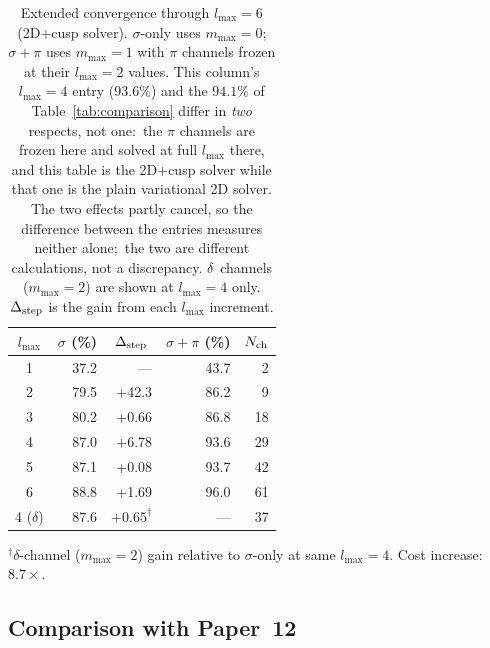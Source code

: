 \documentclass[aps,pra,twocolumn,superscriptaddress,longbibliography]{revtex4-2}
\begin{document}
\begin{table}[h]
\caption{Extended convergence through $l_{\max} = 6$ (2D+cusp solver).
  $\sigma$-only uses $m_{\max} = 0$;
  $\sigma{+}\pi$ uses $m_{\max} = 1$ with $\pi$ channels frozen at
  their $l_{\max} = 2$ values.  This column's $l_{\max} = 4$ entry
  ($93.6\%$) and the $94.1\%$ of Table~\ref{tab:comparison} differ in
  \emph{two} respects, not one:\ the $\pi$ channels are frozen here and
  solved at full $l_{\max}$ there, and this table is the 2D+cusp solver
  while that one is the plain variational 2D solver.  The two effects
  partly cancel, so the difference between the entries measures
  neither alone;\ the two are different calculations, not a
  discrepancy.
  $\delta$~channels ($m_{\max} = 2$) are shown at $l_{\max} = 4$ only.
  $\Delta_{\rm step}$ is the gain from each $l_{\max}$ increment.}
\label{tab:extended_convergence}
\begin{ruledtabular}
\begin{tabular}{cdddd}
$l_{\max}$
  & 
  & 
  & 
  &  \\
 &  37.2 & ---   & 43.7 &   2 \\
2 &  79.5 & +42.3 & 86.2 &   9 \\
3 &  80.2 & +0.66 & 86.8 &  18 \\
4 &  87.0 & +6.78 & 93.6 &  29 \\
5 &  87.1 & +0.08 & 93.7 &  42 \\
6 &  88.8 & +1.69 & 96.0 &  61 \\
 ($\delta$) & 87.6 &  & --- & 37 \\
\end{tabular}
\end{ruledtabular}
{\footnotesize ${}^\dagger$$\delta$-channel ($m_{\max}=2$) gain
relative to $\sigma$-only at same $l_{\max} = 4$.  Cost increase:
$8.7\times$.}
\end{table}

\subsection{Comparison with Paper~12}
\end{document}
